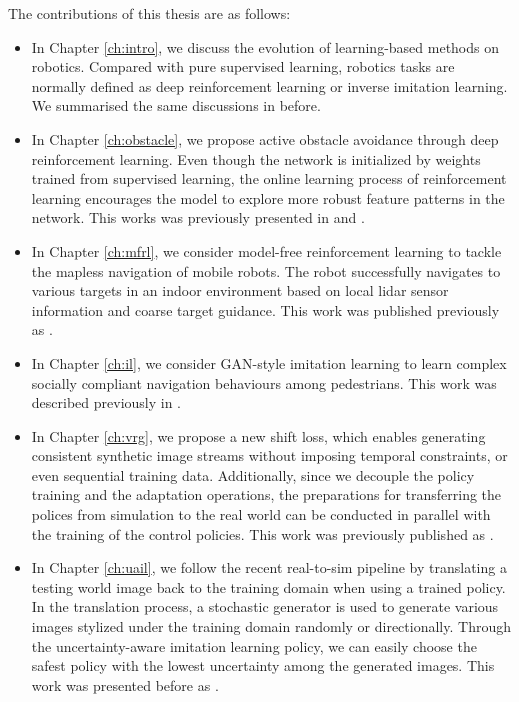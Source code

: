 The contributions of this thesis are as follows:
\begin{itemize}
  \item In Chapter \ref{ch:intro}, we discuss the evolution of learning-based methods on robotics. Compared with pure supervised learning, robotics tasks are normally defined as deep reinforcement learning or inverse imitation learning. We summarised the same discussions in \cite{tai2016survey} before.
  \item In Chapter \ref{ch:obstacle}, we propose active obstacle avoidance through deep reinforcement learning. Even though the network is initialized by weights trained from supervised learning, the online learning process of reinforcement learning encourages the model to explore more robust feature patterns in the network. This works was previously presented in \cite{tl_rcar_2016} and \cite{tai2016towards}.
  \item In Chapter \ref{ch:mfrl}, we consider model-free reinforcement learning to tackle the mapless navigation of mobile robots. The robot successfully navigates to various targets in an indoor environment based on local lidar sensor information and coarse target guidance. This work was published previously as \cite{tai2017virtual}.
  \item In Chapter \ref{ch:il}, we consider GAN-style imitation learning to learn complex socially compliant navigation behaviours among pedestrians. This work was described previously in \cite{tai2018social}.
  \item In Chapter \ref{ch:vrg}, we propose a new shift loss, which enables generating consistent synthetic image streams without imposing temporal constraints, or even sequential training data. Additionally, since we decouple the policy training and the adaptation operations, the preparations for transferring the polices from simulation to the real world can be conducted in parallel with the training of the control policies. This work was previously published as \cite{zhang2019vrgoggles}.
  \item In Chapter \ref{ch:uail}, we follow the recent real-to-sim pipeline by translating a testing world image back to the training domain when using a trained policy. In the translation process, a stochastic generator is used to generate various images stylized under the training domain randomly or directionally. Through the uncertainty-aware imitation learning policy, we can easily choose the safest policy with the lowest uncertainty among the generated images. This work was presented before as \cite{tai2019end}.
\end{itemize}
